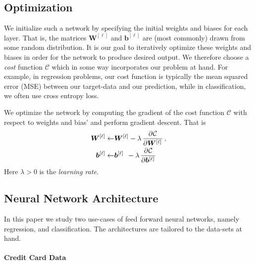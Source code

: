 \documentclass[a4paper, 11pt, oneside, article]{memoir}
\newcommand{\mat}[1]{\bm{#1}}
\newcommand{\cost}{\mathcal{C}}
\begin{document}
	\subsection{Optimization}
	
	We initialize such a network by specifying the initial weights and
	biases for each layer. That is, the matrices \( \mat{W}^{[\ell]} \) and
	\( \mat{b}^{[\ell]} \) are (most commonly) drawn from some random
	distribution. It is our goal to iteratively optimize these weights and
	biases in order for the network to produce desired output. We therefore
	choose a \emph{cost} function  \( \cost \) which in some way
	incorporates our problem at hand. For example, in regression problems,
	our cost function is typically the mean squared error (MSE) between our
	target-data and our prediction, while in classification, we often use
	cross entropy loss.
	
	We optimize the network by computing the gradient of the cost function
	\( \cost \) with respect to weights and bias' and perform gradient
	descent. That is
	\begin{align}
		\begin{split}
			\mat{W}^{[\ell]} \leftarrow &\mat{W}^{[\ell]} - \lambda \dpd{\cost}{{\mat{W}^{[\ell]}}}, \\ 
			\mat{b}^{[\ell]} \leftarrow &\mat{b}^{[\ell]}\;\, - \lambda \dpd{\cost}{{\mat{b}^{[\ell]}}}
		\end{split}
	\end{align}
	Here \( \lambda > 0 \) is the \emph{learning rate}.

	\subsection{Neural Network Architecture}

	In this paper we study two use-cases of feed forward neural networks,
	namely regression, and classification. The architectures are tailored
	to the data-sets at hand. 
	
	\paragraph{Credit Card Data}
\end{document}
